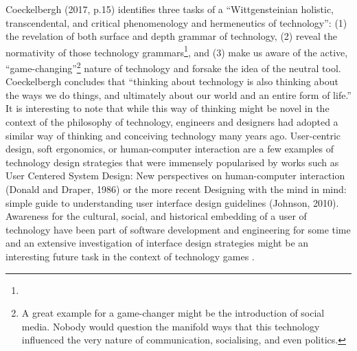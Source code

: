 Coeckelbergh (2017, p.15) identifies three tasks of a “Wittgensteinian
holistic, transcendental, and critical phenomenology and hermeneutics of
technology”: (1) the revelation of both surface and depth grammar of
technology, (2) reveal the normativity of those technology
grammars\footnote{}, and (3) make us
aware of the active, “game-changing”\footnote{A great example for a
game-changer might be the introduction of social media. Nobody
would question the manifold ways that this technology influenced the
very nature of communication, socialising, and even politics.} nature
of technology and forsake the idea of the neutral tool. Coeckelbergh
concludes that “thinking about technology is also thinking about the
ways we do things, and ultimately about our world and an entire form of
life.” It is interesting to note that while this way of thinking might
be novel in the context of the philosophy of technology, engineers and
designers had adopted a similar way of thinking and conceiving
technology many years ago. User-centric design, soft ergonomics, or
human-computer interaction are a few examples of technology design
strategies that were immensely popularised by works such as User
Centered System Design: New perspectives on human-computer interaction
(Donald and Draper, 1986) or the more recent Designing with the
mind in mind: simple guide to understanding user interface design
guidelines (Johnson, 2010). Awareness for the cultural, social, and
historical embedding of a user of technology have been part of software
development and engineering for some time and an extensive investigation
of interface design strategies might be an interesting future task in
the context of technology games .
